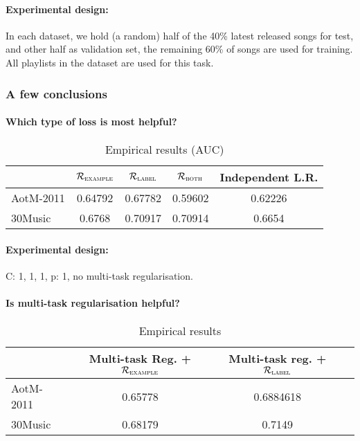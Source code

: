 \paragraph{Experimental design:}
In each dataset, we hold (a random) half of the 40\% latest released songs for test,
and other half as validation set, the remaining 60\% of songs are used for training.
All playlists in the dataset are used for this task.


\subsubsection{A few conclusions}

\paragraph{Which type of loss is most helpful?}
\begin{table}[!h]
\centering
\caption{Empirical results (AUC)}
\begin{tabular}{l|cccc}
\toprule
{}            & $\mathcal{R}_\textsc{example}$ & $\mathcal{R}_\textsc{label}$ & $\mathcal{R}_\textsc{both}$ & Independent L.R. \\
\midrule
AotM-2011     & 0.64792  & 0.67782 & 0.59602  & 0.62226 \\
30Music       & 0.6768   & 0.70917 & 0.70914  & 0.6654 \\
\bottomrule
\end{tabular}
\end{table}

\paragraph{Experimental design:}
C: 1, 1, 1, p: 1, no multi-task regularisation.

\paragraph{Is multi-task regularisation helpful?}

\begin{table}[!h]
\centering
\caption{Empirical results}
\begin{tabular}{l|ccc}
\toprule
{}            & Multi-task Reg. + $\mathcal{R}_\textsc{example}$ & Multi-task reg. + $\mathcal{R}_\textsc{label}$ \\
\midrule
AotM-2011     & 0.65778     & 0.6884618 \\
30Music       & 0.68179     & 0.7149 \\
\bottomrule
\end{tabular}
\end{table}



